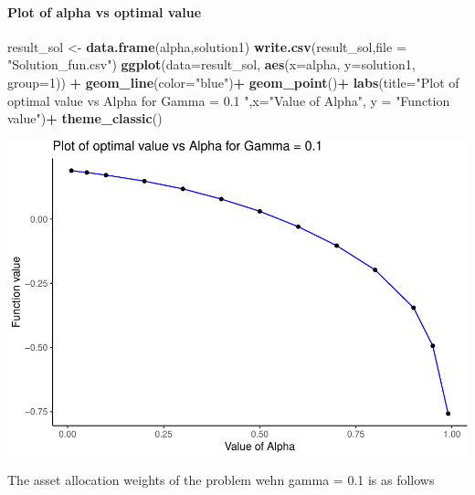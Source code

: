 \documentclass[]{article}
\newenvironment{Shaded}{\begin{snugshade}}{\end{snugshade}}
\newcommand{\KeywordTok}[1]{\textcolor[rgb]{0.13,0.29,0.53}{\textbf{#1}}}
\newcommand{\DataTypeTok}[1]{\textcolor[rgb]{0.13,0.29,0.53}{#1}}
\newcommand{\DecValTok}[1]{\textcolor[rgb]{0.00,0.00,0.81}{#1}}
\newcommand{\StringTok}[1]{\textcolor[rgb]{0.31,0.60,0.02}{#1}}
\newcommand{\OperatorTok}[1]{\textcolor[rgb]{0.81,0.36,0.00}{\textbf{#1}}}
\newcommand{\NormalTok}[1]{#1}
\let\oldparagraph\paragraph
\renewcommand{\paragraph}[1]{\oldparagraph{#1}\mbox{}}
\begin{document}
\paragraph{Plot of alpha vs optimal
value}\label{plot-of-alpha-vs-optimal-value}

\begin{Shaded}
\begin{Highlighting}[]
\NormalTok{result_sol <-}\StringTok{ }\KeywordTok{data.frame}\NormalTok{(alpha,solution1)}
\KeywordTok{write.csv}\NormalTok{(result_sol,}\DataTypeTok{file =} \StringTok{"Solution_fun.csv"}\NormalTok{)}
\KeywordTok{ggplot}\NormalTok{(}\DataTypeTok{data=}\NormalTok{result_sol, }\KeywordTok{aes}\NormalTok{(}\DataTypeTok{x=}\NormalTok{alpha, }\DataTypeTok{y=}\NormalTok{solution1, }\DataTypeTok{group=}\DecValTok{1}\NormalTok{)) }\OperatorTok{+}
\StringTok{  }\KeywordTok{geom_line}\NormalTok{(}\DataTypeTok{color=}\StringTok{"blue"}\NormalTok{)}\OperatorTok{+}
\StringTok{  }\KeywordTok{geom_point}\NormalTok{()}\OperatorTok{+}
\StringTok{  }\KeywordTok{labs}\NormalTok{(}\DataTypeTok{title=}\StringTok{"Plot of optimal value vs Alpha for Gamma = 0.1 "}\NormalTok{,}\DataTypeTok{x=}\StringTok{"Value of Alpha"}\NormalTok{, }\DataTypeTok{y =} \StringTok{"Function value"}\NormalTok{)}\OperatorTok{+}
\StringTok{  }\KeywordTok{theme_classic}\NormalTok{()}
\end{Highlighting}
\end{Shaded}

\includegraphics{Integrated_Management_Formulation_Model_files/figure-latex/unnamed-chunk-6-1.pdf}

The asset allocation weights of the problem wehn gamma = 0.1 is as
follows
\end{document}
